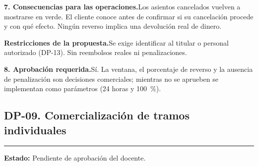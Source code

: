 \documentclass[11pt,a4paper]{article}
\newcommand{\fichacampo}[2]{\noindent\textbf{\color{azulvip}#1}\enspace #2\par\vspace{3pt}}
\begin{document}
{\fichacampo{7. Consecuencias para las operaciones.}{Los asientos cancelados vuelven a mostrarse en verde. El cliente conoce antes de confirmar si su cancelación procede y con qué efecto. Ningún reverso implica una devolución real de dinero.}
\fichacampo{Restricciones de la propuesta.}{Se exige identificar al titular o personal autorizado (DP-13). Sin reembolsos reales ni penalizaciones.}
\fichacampo{8. Aprobación requerida.}{Sí. La ventana, el porcentaje de reverso y la ausencia de penalización son decisiones comerciales; mientras no se aprueben se implementan como parámetros (24 horas y 100~\%).}
}
\clearpage
\subsection{DP-09. Comercialización de tramos individuales}
{\color{doradovip}\rule{\textwidth}{.5pt}}
\textbf{Estado:} Pendiente de aprobación del docente.\par\vspace{4pt}
\end{document}
